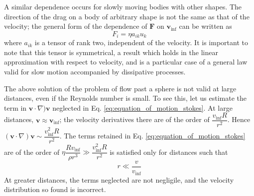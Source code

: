 \documentclass[conference]{IEEEtran}
\theoremstyle{definition}
\theoremstyle{remark}
\begin{document}
    A similar dependence occurs for slowly moving bodies with other shapes. The direction of the drag on a body of arbitrary shape is not the same as that of the velocity; the general form of the dependence of $\mathbf{F}$ on $\mathbf{v}_\mathrm{inf}$ can be written as 
    \begin{equation}
        F_i = \eta a_{ik} u_k
        \label{eq:dependece_F_on_u}
    \end{equation}
    where $a_{ik}$ is a tensor of rank two, independent of the velocity. It is important to note that this tensor is symmetrical, a result which holds in the linear approximation with respect to velocity, and is a particular case of a general law valid for slow motion accompanied by dissipative processes.

    The above solution of the problem of flow past a sphere is not valid at large distances, even if the Reynolds number is small. To see this, let us estimate the term in $\mathbf{v} \cdot \nabla) \mathbf{v}$ neglected in Eq. \ref{eq:equation_of_motion_stokes}. At large distances, $\mathbf{v} \approx \mathbf{v}_\mathrm{inf}$; the velocity derivatives there are of the order of $\dfrac{v_\mathrm{inf} R}{r^2}$. Hence $(\mathbf{v} \cdot \nabla) \mathbf{v} \sim \dfrac{v_\mathrm{inf}^2 R}{r^2}$. The terms retained in Eq. \ref{eq:equation_of_motion_stokes} are of the order of $\eta\dfrac{R v_\mathrm{inf}}{\rho r^3} \gg \dfrac{v_\mathrm{inf}^2 R}{r^2}$ is satisfied only for distances such that
    \begin{equation}
        r \ll \dfrac{v}{v_\mathrm{inf}}
    \end{equation}
    At greater distances, the terms neglected are not negligile, and the velocity distribution so found is incorrect.
\end{document}
